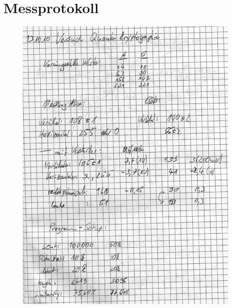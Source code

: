\section{Messprotokoll}
\label{sec:protokoll}
\begin{figure}[!ht]
        \centering
        \includegraphics[page=1,width=.88\textwidth,keepaspectratio]{../data/messprotokoll}
        \label{fig:protokoll}
\end{figure}